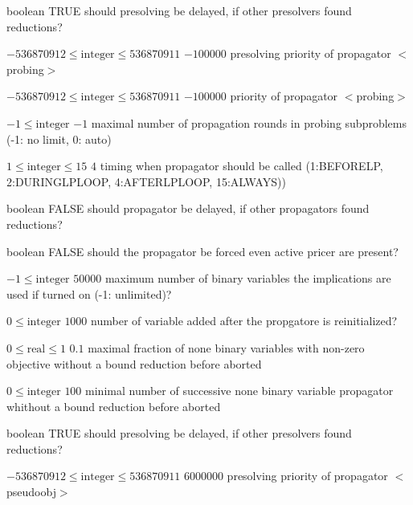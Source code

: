 %
{boolean}%
{TRUE}%
{should presolving be delayed, if other presolvers found reductions?}%
{}

%
{$-536870912\leq\textrm{integer}\leq536870911$}%
{$-100000$}%
{presolving priority of propagator $<$probing$>$}%
{}

%
{$-536870912\leq\textrm{integer}\leq536870911$}%
{$-100000$}%
{priority of propagator $<$probing$>$}%
{}

%
{$-1\leq\textrm{integer}$}%
{$-1$}%
{maximal number of propagation rounds in probing subproblems (-1: no limit, 0: auto)}%
{}

%
{$1\leq\textrm{integer}\leq15$}%
{$4$}%
{timing when propagator should be called (1:BEFORELP, 2:DURINGLPLOOP, 4:AFTERLPLOOP, 15:ALWAYS))}%
{}

%
{boolean}%
{FALSE}%
{should propagator be delayed, if other propagators found reductions?}%
{}

%
{boolean}%
{FALSE}%
{should the propagator be forced even active pricer are present?}%
{}

%
{$-1\leq\textrm{integer}$}%
{$50000$}%
{maximum number of binary variables the implications are used if turned on (-1: unlimited)?}%
{}

%
{$0\leq\textrm{integer}$}%
{$1000$}%
{number of variable added after the propgatore is reinitialized?}%
{}

%
{$0\leq\textrm{real}\leq1$}%
{$0.1$}%
{maximal fraction of none binary variables with non-zero objective without a bound reduction before aborted}%
{}

%
{$0\leq\textrm{integer}$}%
{$100$}%
{minimal number of successive none binary variable propagator whithout a bound reduction before aborted}%
{}

%
{boolean}%
{TRUE}%
{should presolving be delayed, if other presolvers found reductions?}%
{}

%
{$-536870912\leq\textrm{integer}\leq536870911$}%
{$6000000$}%
{presolving priority of propagator $<$pseudoobj$>$}%
{}


